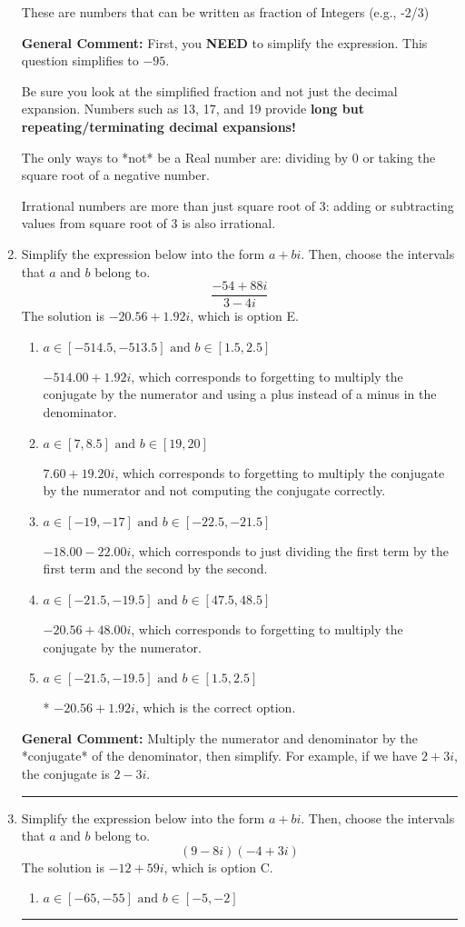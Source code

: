 \documentclass{extbook}[14pt]
\newcommand{\litem}[1]{\item #1

\rule{\textwidth}{0.4pt}}
\begin{document}
\begin{enumerate}
{\begin{enumerate}[label=\Alph*.]
These are numbers that can be written as fraction of Integers (e.g., -2/3)
\end{enumerate}

\textbf{General Comment:} First, you \textbf{NEED} to simplify the expression. This question simplifies to $-95$. 
 
 Be sure you look at the simplified fraction and not just the decimal expansion. Numbers such as 13, 17, and 19 provide \textbf{long but repeating/terminating decimal expansions!} 
 
 The only ways to *not* be a Real number are: dividing by 0 or taking the square root of a negative number. 
 
 Irrational numbers are more than just square root of 3: adding or subtracting values from square root of 3 is also irrational.
}
\litem{
Simplify the expression below into the form $a+bi$. Then, choose the intervals that $a$ and $b$ belong to.
\[ \frac{-54 + 88 i}{3 - 4 i} \]The solution is \( -20.56  + 1.92 i \), which is option E.\begin{enumerate}[label=\Alph*.]
\item \( a \in [-514.5, -513.5] \text{ and } b \in [1.5, 2.5] \)

 $-514.00  + 1.92 i$, which corresponds to forgetting to multiply the conjugate by the numerator and using a plus instead of a minus in the denominator.
\item \( a \in [7, 8.5] \text{ and } b \in [19, 20] \)

 $7.60  + 19.20 i$, which corresponds to forgetting to multiply the conjugate by the numerator and not computing the conjugate correctly.
\item \( a \in [-19, -17] \text{ and } b \in [-22.5, -21.5] \)

 $-18.00  - 22.00 i$, which corresponds to just dividing the first term by the first term and the second by the second.
\item \( a \in [-21.5, -19.5] \text{ and } b \in [47.5, 48.5] \)

 $-20.56  + 48.00 i$, which corresponds to forgetting to multiply the conjugate by the numerator.
\item \( a \in [-21.5, -19.5] \text{ and } b \in [1.5, 2.5] \)

* $-20.56  + 1.92 i$, which is the correct option.
\end{enumerate}

\textbf{General Comment:} Multiply the numerator and denominator by the *conjugate* of the denominator, then simplify. For example, if we have $2+3i$, the conjugate is $2-3i$.
}
\litem{
Simplify the expression below into the form $a+bi$. Then, choose the intervals that $a$ and $b$ belong to.
\[ (9 - 8 i)(-4 + 3 i) \]The solution is \( -12 + 59 i \), which is option C.\begin{enumerate}[label=\Alph*.]
\item \( a \in [-65, -55] \text{ and } b \in [-5, -2] \)


\end{enumerate}}
\end{enumerate}
\end{document}

